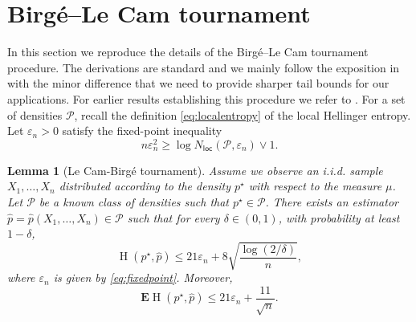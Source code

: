 \documentclass[11pt]{article}
\newcommand{\E}{{\mathbf E}}
\renewcommand{\le}{\leqslant}
\renewcommand{\ge}{\geqslant}
\newcommand{\eps}{\varepsilon}
\newcommand{\nloc}{N_{\mathsf{loc}}}
\newcommand{\hel}{\operatorname{H}}
\newtheorem{lemma}{Lemma}
\theoremstyle{definition}
\theoremstyle{remark}
\begin{document}
\section{Birg\'e--Le Cam tournament}
\label{sec:blc-local-pointwise}
In this section we reproduce the details of the Birg\'e--Le Cam tournament procedure. The derivations are standard and we mainly follow the exposition in \cite[Section 32.2]{polyanskiy2025information} with the minor difference that we need to provide sharper tail bounds for our applications. For earlier results establishing this procedure we refer to \cite{lecam1973convergence, birge1983approximation, birge1985non}. For a set of densities $\mathcal P$, recall the definition \eqref{eq:localentropy} of the local Hellinger entropy.
Let $\eps_n>0$ satisfy the fixed-point inequality
\begin{equation}
\label{eq:fixedpoint}
n\eps_n^2\ge \log \nloc(\mathcal{P},\eps_n) \lor 1.
\end{equation}

\begin{lemma}[Le Cam-Birg\'e tournament]
\label{lem:lecam-birge-local}
Assume we observe an i.i.d. sample $X_1, \ldots, X_n$ distributed according to the density $p^\star$ with respect to the measure $\mu$. Let $\mathcal P$ be a known class of densities such that $p^\star \in \mathcal{P}$. 
There exists an estimator $\widehat{p}=\widehat{p}(X_1,\ldots,X_n)\in\mathcal{P}$ such that for every $\delta\in(0,1)$, with probability at least $1-\delta$,
\[
\hel(p^\star,\widehat{p})\le 21\eps_n+8\sqrt{\frac{\log(2/\delta)}{n}},
\]
where $\eps_n$ is given by \eqref{eq:fixedpoint}.
Moreover, 
\[
\E\hel(p^\star,\widehat{p}) \le 21\eps_n + \frac{11}{\sqrt{n}}.
\]
\end{lemma}
\end{document}
